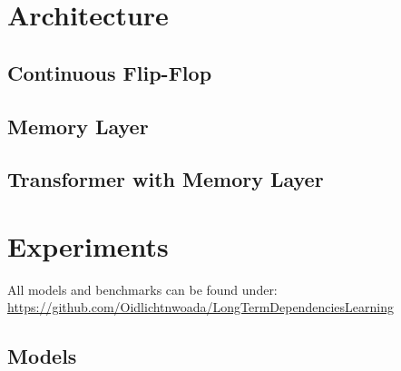 \documentclass[draft,final]{vutinfth} %
\begin{document}


    \chapter{Architecture}


    \section{Continuous Flip-Flop}


    \section{Memory Layer}


    \section{Transformer with Memory Layer}


    \chapter{Experiments}
    All models and benchmarks can be found under: \\
    \url{https://github.com/Oidlichtnwoada/LongTermDependenciesLearning}


    \section{Models}
\end{document}

